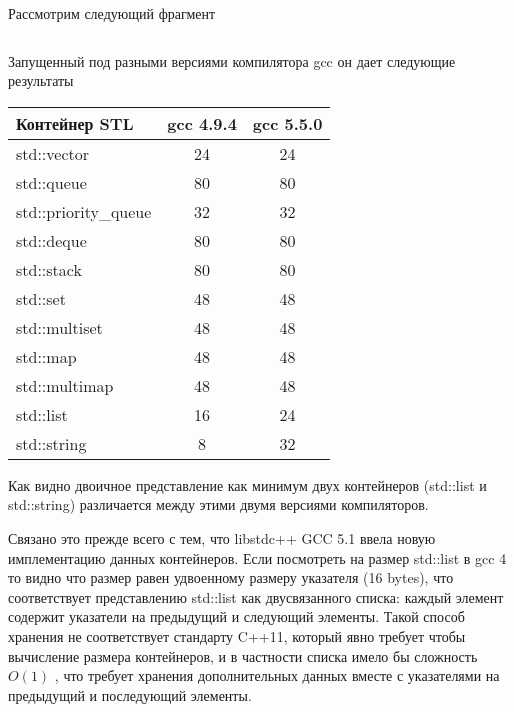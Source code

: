 \documentclass[14pt,a4paper]{article}
\begin{document}
Рассмотрим следующий фрагмент
\inputminted{c++}{./src/sizes.cpp}

Запущенный под разными версиями компилятора gcc он дает следующие
результаты 
\begin{longtable}{|l|c|c|}
\hline
Контейнер STL & gcc 4.9.4 & gcc 5.5.0 \\
\hline
std::vector & 24 & 24 \\
std::queue & 80 & 80 \\
std::priority\_queue & 32 & 32 \\
std::deque & 80 & 80 \\
std::stack & 80 & 80 \\
std::set & 48 & 48 \\
std::multiset & 48 & 48 \\
std::map & 48 & 48 \\
std::multimap & 48 & 48 \\
std::list & 16 & 24 \\
std::string & 8 & 32 \\
\hline
\end{longtable}

Как видно двоичное представление как минимум двух контейнеров
(std::list и std::string) различается между этими двумя версиями
компиляторов.

Связано это прежде всего с тем, что libstdc++ GCC 5.1 ввела
\cite{DualABI}  новую имплементацию данных контейнеров. Если
посмотреть на размер std::list в gcc 4 то видно что размер равен
удвоенному размеру
указателя (16 bytes), что соответствует представлению std::list как
двусвязанного списка: каждый элемент содержит указатели на предыдущий
и следующий элементы. Такой способ хранения не соответствует стандарту
C++11, который явно требует чтобы вычисление размера контейнеров, и
в частности списка имело бы сложность $O(1)$ \cite{ISO:2012:III}, что требует хранения
дополнительных данных вместе с указателями на предыдущий и последующий
элементы.   




\end{document}

